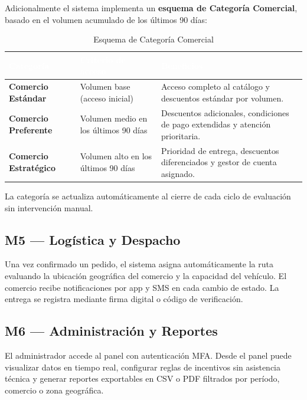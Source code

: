 \documentclass[12pt, a4paper]{report}
\begin{document}
Adicionalmente el sistema implementa un \textbf{esquema de Categoría Comercial}, basado en el volumen acumulado de los últimos 90 días:

\begin{table}[ht]
\centering
\renewcommand{\arraystretch}{1.4}
\begin{tabularx}{\textwidth}{>{\bfseries}p{3.8cm} X X}
\toprule
\rowcolor{utplblue}
\textcolor{white}{\textbf{Categoría}} &
\textcolor{white}{\textbf{Criterio de acceso}} &
\textcolor{white}{\textbf{Beneficios}} \\
\midrule
\rowcolor{lightgray}
Comercio Estándar & Volumen base (acceso inicial) & Acceso completo al catálogo y descuentos estándar por volumen. \\
\rowcolor{white}
Comercio Preferente & Volumen medio en los últimos 90 días & Descuentos adicionales, condiciones de pago extendidas y atención prioritaria. \\
\rowcolor{lightgray}
Comercio Estratégico & Volumen alto en los últimos 90 días & Prioridad de entrega, descuentos diferenciados y gestor de cuenta asignado. \\
\bottomrule
\end{tabularx}
\caption{Esquema de Categoría Comercial}
\end{table}

La categoría se actualiza automáticamente al cierre de cada ciclo de evaluación sin intervención manual.

\subsection{M5 — Logística y Despacho}

Una vez confirmado un pedido, el sistema asigna automáticamente la ruta evaluando la ubicación geográfica del comercio y la capacidad del vehículo. El comercio recibe notificaciones por app y SMS en cada cambio de estado. La entrega se registra mediante firma digital o código de verificación.

\subsection{M6 — Administración y Reportes}

El administrador accede al panel con autenticación MFA. Desde el panel puede visualizar datos en tiempo real, configurar reglas de incentivos sin asistencia técnica y generar reportes exportables en CSV o PDF filtrados por período, comercio o zona geográfica.
\end{document}
